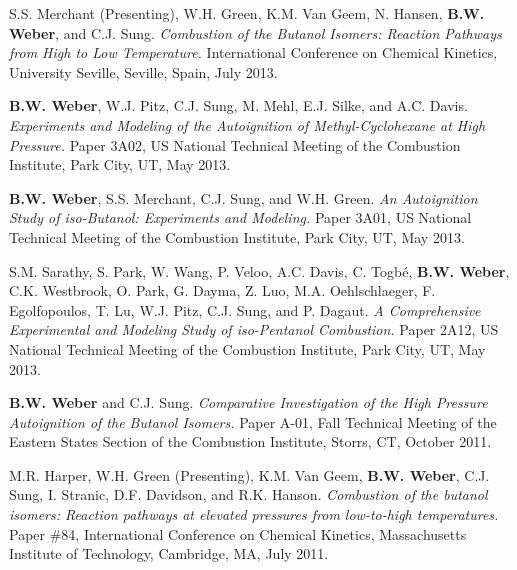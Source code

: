 \begin{bibsection}
\item[] S.S. Merchant (Presenting), W.H. Green, K.M. Van Geem, N.
        Hansen, \textbf{B.W. Weber}, and C.J. Sung. 
        \textit{Combustion of the Butanol Isomers: Reaction Pathways
        from High to Low Temperature.}  International 
        Conference on Chemical Kinetics, University Seville, Seville,
        Spain, July 2013.

\item[] \textbf{B.W. Weber}, W.J. Pitz, C.J. Sung, M. Mehl,
        E.J. Silke, and A.C. Davis. \textit{Experiments and Modeling of
        the Autoignition of Methyl-Cyclohexane at High Pressure.}
        Paper 3A02,  US National Technical Meeting of the
        Combustion Institute, Park City, UT, May 2013.

\item[] \textbf{B.W. Weber}, S.S. Merchant, C.J. Sung, and W.H. Green.
        \textit{An Autoignition Study of iso-Butanol: Experiments and
        Modeling.} Paper 3A01,  US National Technical
        Meeting of the Combustion Institute, Park City, UT, May 2013.

\item[] S.M. Sarathy, S. Park, W. Wang, P. Veloo, A.C. Davis,
        C. Togbé, \textbf{B.W. Weber}, C.K. Westbrook, O. Park,
        G. Dayma, Z. Luo, M.A. Oehlschlaeger, F. Egolfopoulos, T. Lu,
        W.J. Pitz, C.J. Sung, and P. Dagaut. \textit{A Comprehensive
        Experimental and Modeling Study of iso-Pentanol Combustion.}
        Paper 2A12,  US National Technical Meeting of the
        Combustion Institute, Park City, UT, May 2013.

\item[] \textbf{B.W. Weber} and C.J. Sung. \textit{Comparative
        Investigation of the High Pressure Autoignition of the Butanol
        Isomers.} Paper A-01, Fall Technical Meeting of the Eastern
        States Section of the Combustion Institute, Storrs, CT, October
        2011.

\item[] M.R. Harper, W.H. Green (Presenting), K.M. Van Geem,
        \textbf{B.W. Weber}, C.J. Sung, I. Stranic, D.F. Davidson,
        and R.K. Hanson. \textit{Combustion of the butanol isomers:
        Reaction pathways at elevated pressures from low-to-high 
        temperatures.} Paper \#84,  International 
        Conference on Chemical Kinetics, Massachusetts Institute of 
        Technology, Cambridge, MA, July 2011.


\end{bibsection}

